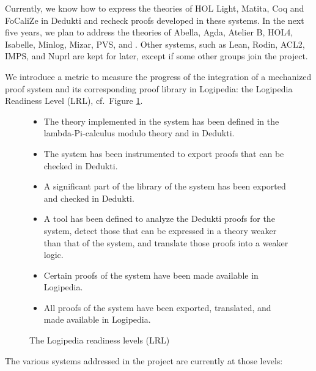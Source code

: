 Currently, we know how to express the theories of {\sc HOL Light},
{\sc Matita}, {\sc Coq} and {\sc FoCaliZe} in {\sc Dedukti} and recheck proofs
developed in these systems. In the next five years, we plan to address
the theories of {\sc Abella}, {\sc Agda}, {\sc Atelier B},
{\sc HOL4}, {\sc Isabelle}, {\sc Minlog}, {\sc Mizar},
{\sc PVS}, and \tlaplus. Other systems, such as {\sc Lean}, {\sc Rodin}, {\sc ACL2},
{\sc IMPS}, and {\sc Nuprl} are kept for later, except if some other
groups join the project.

We introduce a metric to measure the progress of the
integration of a mechanized proof system and its corresponding proof library in
Logipedia: the Logipedia Readiness Level (LRL), cf.\ Figure \ref{lrl}.

\begin{figure}[ht]
\begin{itemize}
\item[LRL level 1:]
The theory implemented in the system has been defined in
the lambda-Pi-calculus modulo theory and in Dedukti.

\item[LRL level 2:]
The system has been instrumented to export proofs that
can be checked in Dedukti.

\item[LRL level 3:]
A significant part of the library of the system has been exported and checked in
Dedukti.

\item[LRL level 4:]
A tool has been defined to analyze the Dedukti proofs for the system,
detect those that can be expressed in a theory weaker than that of the
system, and translate those proofs into a weaker logic.

\item[LRL level 5:]
Certain proofs of the system have been made available in Logipedia.

\item[LRL level 6:]
All proofs of the system have been exported, translated,
and made available in Logipedia.
\end{itemize}
\caption{The Logipedia readiness levels (LRL)\label{lrl}}
\end{figure}

The various systems addressed in the project are currently at those levels:

